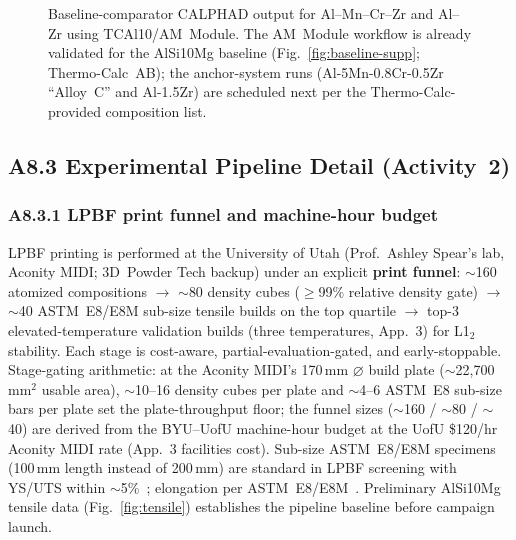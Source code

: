 \documentclass[11pt,letterpaper]{article}
\begin{document}
\begin{figure}[!tb]
  \centering
  \caption{Baseline-comparator CALPHAD output for Al--Mn--Cr--Zr and Al--Zr using TCAl10/AM~Module. The AM~Module workflow is already validated for the AlSi10Mg baseline (Fig.~\ref{fig:baseline-supp}; Thermo-Calc~AB); the anchor-system runs (Al-5Mn-0.8Cr-0.5Zr ``Alloy~C'' and Al-1.5Zr) are scheduled next per the Thermo-Calc-provided composition list.}
  \label{fig:anchor-calphad}
\end{figure}

\subsection*{A8.3 Experimental Pipeline Detail (Activity~2)}

\subsubsection*{A8.3.1 LPBF print funnel and machine-hour budget}
\label{app:a83-funnel}

LPBF printing is performed at the University of Utah (Prof.\ Ashley
Spear's lab, Aconity MIDI; 3D~Powder Tech backup) under an explicit
\textbf{print funnel}: $\sim$160 atomized compositions $\to$ $\sim$80
density cubes ($\geq$99\% relative density gate) $\to$ $\sim$40
ASTM~E8/E8M sub-size tensile builds on the top quartile $\to$
top-3 elevated-temperature validation builds (three temperatures, App.~3)
for L1$_2$ stability. Each stage is cost-aware,
partial-evaluation-gated, and early-stoppable. Stage-gating
arithmetic: at the Aconity MIDI's 170\,mm $\varnothing$ build plate
($\sim$22{,}700\,mm$^{2}$ usable area), $\sim$10--16 density cubes per
plate and $\sim$4--6 ASTM~E8 sub-size bars per plate set the
plate-throughput floor; the funnel sizes ($\sim$160 / $\sim$80 / $\sim$40)
are derived from the BYU--UofU machine-hour budget at the UofU
\$120/hr Aconity MIDI rate (App.~3 facilities cost). Sub-size ASTM~E8/E8M
specimens (100\,mm length instead of 200\,mm) are standard in LPBF
screening with YS/UTS within
$\sim$5\%~\cite{paraschiv_2023_ma16144930,wang_2020_17452759};
elongation per ASTM~E8/E8M~\cite{astm_2024_e8e8m}.  Preliminary
AlSi10Mg tensile data (Fig.~\ref{fig:tensile}) establishes the pipeline
baseline before campaign launch.
\end{document}
